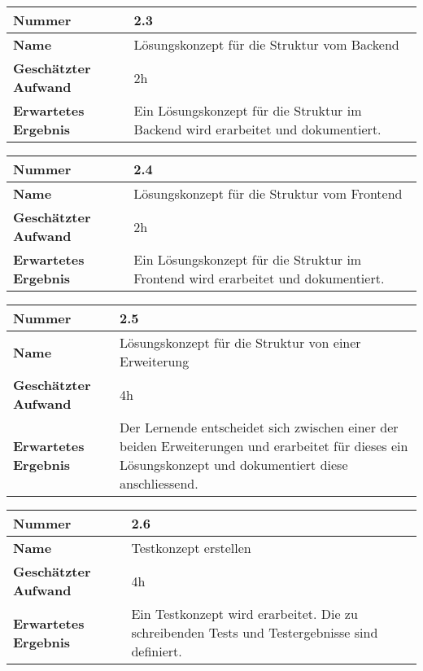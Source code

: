 \begin{longtable}{p{}|p{}}
	\hline
	\textbf{Nummer}                 & \textbf{2.3}            \\
	\hline
	\textbf{Name}   				& Lösungskonzept für die Struktur vom Backend                  \\
	\hline
	\textbf{Geschätzter Aufwand}    & 2h                                    \\
	\hline
	\textbf{Erwartetes Ergebnis}    & Ein Lösungskonzept für die Struktur im Backend wird erarbeitet und dokumentiert.                                    \\
	\hline
\end{longtable}\label{tab:planen-2.3}

\begin{longtable}{p{}|p{}}
	\hline
	\textbf{Nummer}                 & \textbf{2.4}            \\
	\hline
	\textbf{Name}   				& Lösungskonzept für die Struktur vom Frontend                  \\
	\hline
	\textbf{Geschätzter Aufwand}    & 2h                                    \\
	\hline
	\textbf{Erwartetes Ergebnis}    & Ein Lösungskonzept für die Struktur im Frontend wird erarbeitet und dokumentiert.                                    \\
	\hline
\end{longtable}\label{tab:planen-2.4}

\begin{longtable}{p{}|p{}}
	\hline
	\textbf{Nummer}                 & \textbf{2.5}            \\
	\hline
	\textbf{Name}   				& Lösungskonzept für die Struktur von einer Erweiterung                  \\
	\hline
	\textbf{Geschätzter Aufwand}    & 4h                                    \\
	\hline
	\textbf{Erwartetes Ergebnis}    & Der Lernende entscheidet sich zwischen einer der beiden Erweiterungen und erarbeitet für dieses ein Lösungskonzept und dokumentiert diese anschliessend.                                    \\
	\hline
\end{longtable}\label{tab:planen-2.5}

\begin{longtable}{p{}|p{}}
	\hline
	\textbf{Nummer}                 & \textbf{2.6}            \\
	\hline
	\textbf{Name}   				& Testkonzept erstellen                  \\
	\hline
	\textbf{Geschätzter Aufwand}    & 4h                                    \\
	\hline
	\textbf{Erwartetes Ergebnis}    & Ein Testkonzept wird erarbeitet. Die zu schreibenden Tests und Testergebnisse sind definiert.                                    \\
	\hline
\end{longtable}\label{tab:planen-2.6}

